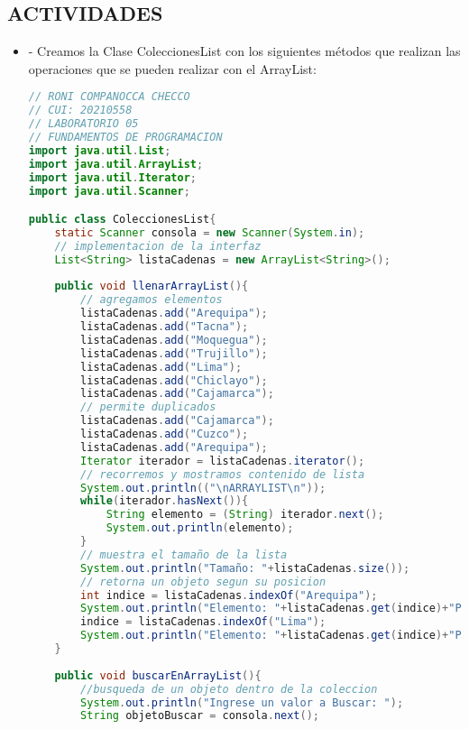 \documentclass{article}
\begin{document}
\begin{itemize}
    \section{ACTIVIDADES}
	\begin{itemize}
        \subsection{EJERCICIO RESUELTO}
		\item - Creamos la Clase ColeccionesList con los siguientes métodos que realizan las operaciones que se pueden realizar con el ArrayList:

        \begin{lstlisting}[language=java]
// RONI COMPANOCCA CHECCO
// CUI: 20210558
// LABORATORIO 05
// FUNDAMENTOS DE PROGRAMACION 
import java.util.List;
import java.util.ArrayList;
import java.util.Iterator;
import java.util.Scanner;

public class ColeccionesList{
    static Scanner consola = new Scanner(System.in);
    // implementacion de la interfaz
    List<String> listaCadenas = new ArrayList<String>();
    
    public void llenarArrayList(){
        // agregamos elementos
        listaCadenas.add("Arequipa");
        listaCadenas.add("Tacna");
        listaCadenas.add("Moquegua");
        listaCadenas.add("Trujillo");
        listaCadenas.add("Lima");
        listaCadenas.add("Chiclayo");
        listaCadenas.add("Cajamarca");
        // permite duplicados
        listaCadenas.add("Cajamarca");
        listaCadenas.add("Cuzco");
        listaCadenas.add("Arequipa");
        Iterator iterador = listaCadenas.iterator();
        // recorremos y mostramos contenido de lista
        System.out.println(("\nARRAYLIST\n"));
        while(iterador.hasNext()){
            String elemento = (String) iterador.next();
            System.out.println(elemento);
        }
        // muestra el tamaño de la lista
        System.out.println("Tamaño: "+listaCadenas.size());
        // retorna un objeto segun su posicion
        int indice = listaCadenas.indexOf("Arequipa");
        System.out.println("Elemento: "+listaCadenas.get(indice)+"Posicion: "+indice);
        indice = listaCadenas.indexOf("Lima");
        System.out.println("Elemento: "+listaCadenas.get(indice)+"Posicion: "+indice);
    }
        
    public void buscarEnArrayList(){
        //busqueda de un objeto dentro de la coleccion
        System.out.println("Ingrese un valor a Buscar: ");
        String objetoBuscar = consola.next();


\end{lstlisting}
\end{itemize}
\end{itemize}
\end{document}
